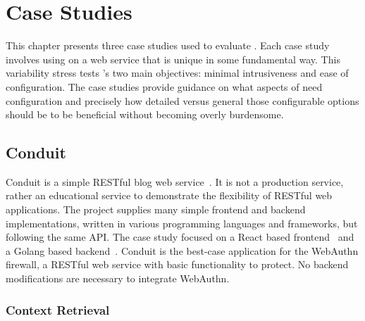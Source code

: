 
\chapter{Case Studies}\label{Chap:CaseStudies}

This chapter presents three case studies used to evaluate \sys{}. Each case study involves using \sys{} on a web service that is unique in some fundamental way. This variability stress tests \sys{}'s two main objectives: minimal intrusiveness and ease of configuration. The case studies provide guidance on what aspects of \sys{} need configuration and precisely how detailed versus general those configurable options should be to be beneficial without becoming overly burdensome.

\section{Conduit}

Conduit is a simple RESTful blog web service~\cite{conduit}. It is not a production service, rather an educational service to demonstrate the flexibility of RESTful web applications. The project supplies many simple frontend and backend implementations, written in various programming languages and frameworks, but following the same API. The case study focused on a React based frontend~\cite{conduit-frontend} and a Golang based backend~\cite{conduit-backend}. Conduit is the best-case application for the WebAuthn firewall, a RESTful web service with basic functionality to protect. No backend modifications are necessary to integrate WebAuthn.



\subsection{Context Retrieval}\label{Sec:Conduit_ContextRetrieval}

